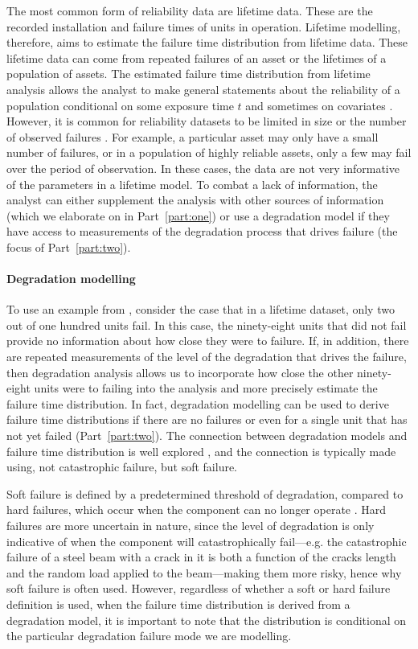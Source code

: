 The most common form of reliability data are lifetime data. These are the recorded installation and failure times of units in operation. Lifetime modelling, therefore, aims to estimate the failure time distribution from lifetime data. These lifetime data can come from repeated failures of an asset or the lifetimes of a population of assets. The estimated failure time distribution from lifetime analysis allows the analyst to make general statements about the reliability of a population conditional on some exposure time $t$ and sometimes on covariates \citep{moore2016}. However, it is common for reliability datasets to be limited in size or the number of observed failures \citep{Meeker2022}. For example, a particular asset may only have a small number of failures, or in a population of highly reliable assets, only a few may fail over the period of observation. In these cases, the data are not very informative of the parameters in a lifetime model. To combat a lack of information, the analyst can either supplement the analysis with other sources of information (which we elaborate on in Part~\ref{part:one}) or use a degradation model if they have access to measurements of the degradation process that drives failure (the focus of Part~\ref{part:two}).

\paragraph*{Degradation modelling} 

To use an example from \citet{Meeker2022}, consider the case that in a lifetime dataset, only two out of one hundred units fail. In this case, the ninety-eight units that did not fail provide no information about how close they were to failure. If, in addition, there are repeated measurements of the level of the degradation that drives the failure, then degradation analysis allows us to incorporate how close the other ninety-eight units were to failing into the analysis and more precisely estimate the failure time distribution. In fact, degradation modelling can be used to derive failure time distributions if there are no failures or even for a single unit that has not yet failed (Part~\ref{part:two}). The connection between degradation models and failure time distribution is well explored \citep{lu1996,bae2007,Meeker2022,lawless2004}, and the connection is typically made using, not catastrophic failure, but soft failure.

Soft failure is defined by a predetermined threshold of degradation, compared to hard failures, which occur when the component can no longer operate \citep{hamada_2008}. Hard failures are more uncertain in nature, since the level of degradation is only indicative of when the component will catastrophically fail---e.g. the catastrophic failure of a steel beam with a crack in it is both a function of the cracks length and the random load applied to the beam---making them more risky, hence why soft failure is often used. However, regardless of whether a soft or hard failure definition is used, when the failure time distribution is derived from a degradation model, it is important to note that the distribution is conditional on the particular degradation failure mode we are modelling.

